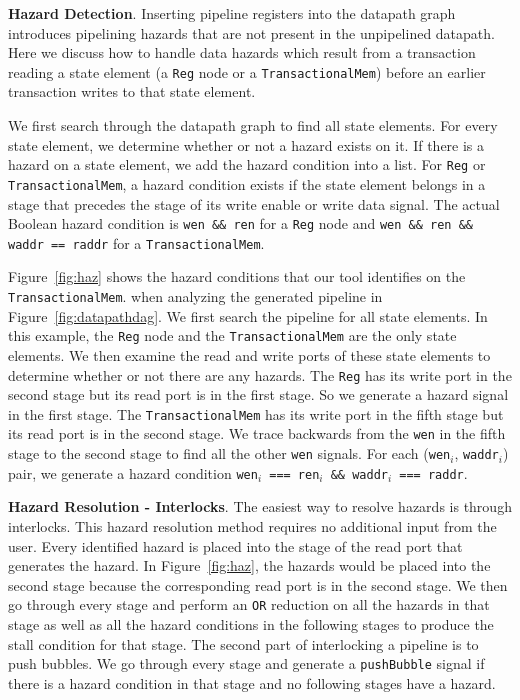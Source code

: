 {\bf Hazard Detection}. Inserting pipeline registers into the datapath
graph introduces pipelining hazards that are not present in the
unpipelined datapath. Here we discuss how to handle data hazards which
result from a transaction reading a state element (a {\tt Reg} node or a
{\tt TransactionalMem}) before an earlier transaction writes to that state
element. 

We first search through the datapath graph to find all state
elements. For every state element, we determine whether or not a
hazard exists on it. If there is a hazard on a state element, we add
the hazard condition into a list. For {\tt Reg} or {\tt TransactionalMem}, a
hazard condition exists if the state element belongs in a stage that precedes the
stage of its write enable or write data signal. The actual Boolean
hazard condition is {\tt wen \&\& ren} for a {\tt Reg} node and
{\tt wen \&\& ren \&\& waddr == raddr} for a {\tt TransactionalMem}.

Figure~\ref{fig:haz} shows the hazard conditions that our tool
identifies on the {\tt TransactionalMem}. when analyzing the generated pipeline in
Figure~\ref{fig:datapathdag}. We first search the pipeline for all
state elements. In this example, the {\tt Reg} node and the 
{\tt TransactionalMem} are the only state elements. We then examine
the read and write ports of these state elements to determine whether
or not there are any hazards. The {\tt Reg} has its write port in the
second stage but its read port is in the first stage. So we generate a
hazard signal in the first stage. The {\tt TransactionalMem} has its
write port in the fifth stage but its read port is in the second
stage. We trace backwards from the {\tt wen} in the fifth stage to the
second stage to find all the other {\tt wen} signals. For each 
({\tt wen}$_i$, {\tt waddr}$_i$) pair, we generate a hazard condition
{\tt wen$_i$ === ren$_i$ \&\& waddr$_i$ === raddr}.

{\bf Hazard Resolution - Interlocks}. The easiest way to resolve
hazards is through interlocks. This hazard resolution method requires
no additional input from the user. Every identified hazard is placed
into the stage of the read port that generates the hazard. In
Figure~\ref{fig:haz}, the hazards would be placed into the second
stage because the corresponding read port is in the second stage. We
then go through every stage and perform an {\tt OR} reduction on all
the hazards in that stage as well as all the hazard conditions in the
following stages to produce the stall condition for that stage. The
second part of interlocking a pipeline is to push bubbles. We go
through every stage and generate a {\tt pushBubble} signal if there is
a hazard condition in that stage and no following stages have a
hazard.

